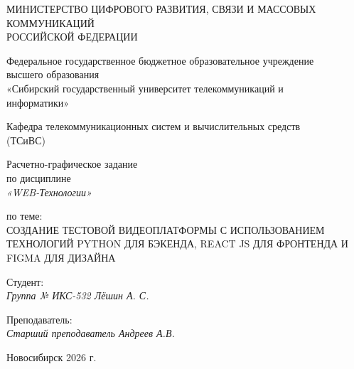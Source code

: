 \documentclass[a4paper,14pt,oneside,openany]{memoir}
\begin{document}
\thispagestyle{empty}

\begin{center}
    МИНИСТЕРСТВО ЦИФРОВОГО РАЗВИТИЯ, СВЯЗИ И МАССОВЫХ \\ КОММУНИКАЦИЙ \\ РОССИЙСКОЙ ФЕДЕРАЦИИ

    \vspace{20pt}

    Федеральное государственное бюджетное образовательное учреждение \\ высшего образования \\
    «Сибирский государственный университет телекоммуникаций и \\ информатики»

    \vspace{20pt}

    Кафедра телекоммуникационных систем и вычислительных средств \\ (ТСиВС)
\end{center}

\vfill

\begin{center}
    Расчетно-графическое задание \\
    по дисциплине \\
    \textit{«WEB-Технологии»}

    \vspace{20pt}

    по теме: \\
    \uppercase{Создание тестовой видеоплатформы с использованием технологий Python для бэкенда, React JS для фронтенда и Figma для дизайна}
\end{center}

\vfill

\noindent Студент: \\
\textit{Группа № ИКС-532 \hfill Лёшин А. С.}

\vspace{20pt}

\noindent Преподаватель: \\
\textit{Старший преподаватель \hfill Андреев А.В.}

\vfill

\begin{center}
    Новосибирск 2026 г.
\end{center}

\newpage
\setcounter{page}{2}
\OnehalfSpacing*
\end{document}
